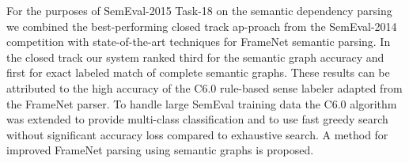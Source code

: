 For the purposes of SemEval-2015 Task-18 on the semantic dependency parsing we combined the best-performing closed track ap-proach from the SemEval-2014 competition with state-of-the-art techniques for FrameNet semantic parsing. In the closed track our system ranked third for the semantic graph accuracy and first for exact labeled match of complete semantic graphs. These results can be attributed to the high accuracy of the C6.0 rule-based sense labeler adapted from the FrameNet parser. To handle large SemEval training data the C6.0 algorithm was extended to provide multi-class classification and to use fast greedy search without significant accuracy loss compared to exhaustive search. A method for improved FrameNet parsing using semantic graphs is proposed.
